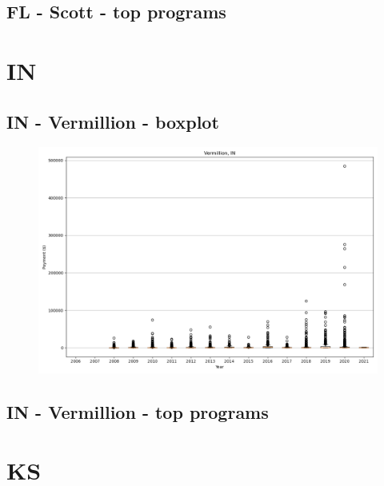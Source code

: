 \subsection*{FL - Scott - top programs}

\newpage
\section*{IN}
\subsection*{IN - Vermillion - boxplot}
\begin{figure}[h]
\centering
\includegraphics[width=7in]{../output/boxplots/counties/Vermillion-IN_boxplot.png}
\end{figure}


\subsection*{IN - Vermillion - top programs}

\newpage
\section*{KS}
